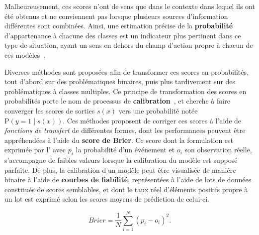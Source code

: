 Malheureusement, ces scores n'ont de sens que dans le contexte dans lequel ils ont été obtenus et ne conviennent pas lorsque plusieurs sources d'information différentes sont combinées. Ainsi, une estimation précise de la \textbf{probabilité} d'appartenance à chacune des classes est un indicateur plus pertinent dans ce type de situation, ayant un sens en dehors du champ d'action propre à chacun de ces modèles~\cite{Zadrozny2002}.\par

Diverses méthodes sont proposées afin de transformer ces scores en probabilités, tout d'abord sur des problématiques binaires, puis plus tardivement sur des problématiques à classes multiples. Ce principe de transformation des scores en probabilités porte le nom de processus de \textbf{calibration}~\cite{Murphy1977}, et cherche à faire converger les scores de sorties $s(x)$ vers une probabilité notée $\mathrm{P}(y=1 \mid s(x))$. Ces méthodes proposent de corriger ces scores à l'aide de \textit{fonctions de transfert} de différentes formes, dont les performances peuvent être appréhendées à l'aide du \textbf{score de Brier}. Ce score dont la formulation est exprimée par l' avec $p_i$ la probabilité d'un événement et $o_i$ son observation réelle, s'accompagne de faibles valeurs lorsque la calibration du modèle est supposé parfaite. De plus, la calibration d'un modèle peut être visualisée de manière binaire à l'aide de \textbf{courbes de fiabilité}, représentées à l'aide de lots de données constitués de scores semblables, et dont le taux réel d'éléments positifs propre à un lot est exprimé selon les scores moyens de prédiction de celui-ci.\par

\begin{equation} 
    \label{eq:brier_score}
    Brier = \frac{1}{N}\sum\limits _{i=1}^{N}(p_i-o_i)^2.
\end{equation}

